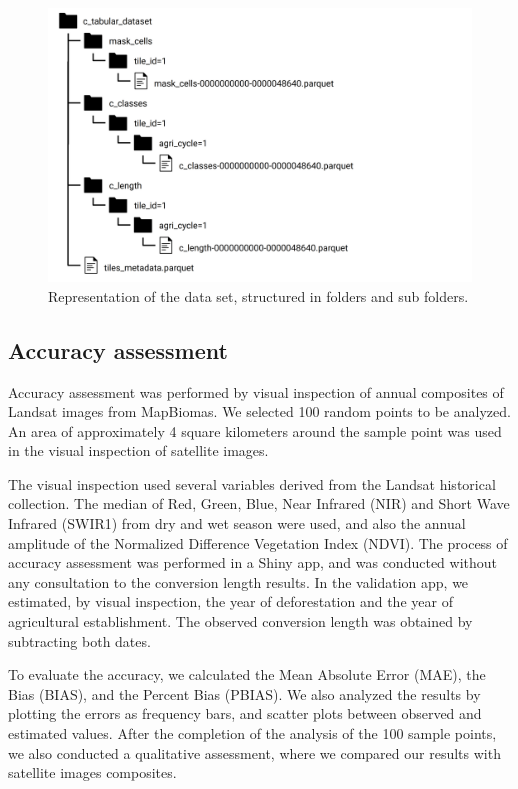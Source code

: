 \documentclass[essd, manuscript]{copernicus}
\begin{document}
\begin{figure}[h]
\includegraphics[width=17cm]{figs/dataset_structure} \caption{ Representation of the data set, structured in folders and sub folders.}\label{fig:dataset-plot}
\end{figure}

\subsection{Accuracy assessment}

Accuracy assessment was performed by visual inspection of annual composites of Landsat images from MapBiomas.
We selected 100 random points to be analyzed.
An area of approximately 4 square kilometers around the sample point was used in the visual inspection of satellite images.

The visual inspection used several variables derived from the Landsat historical collection.
The median of Red, Green, Blue, Near Infrared (NIR) and Short Wave Infrared (SWIR1) from dry and wet season were used, and also the annual amplitude of the Normalized Difference Vegetation Index (NDVI).
The process of accuracy assessment was performed in a Shiny app, and was conducted without any consultation to the conversion length results.
In the validation app, we estimated, by visual inspection, the year of deforestation and the year of agricultural establishment.
The observed conversion length was obtained by subtracting both dates.

To evaluate the accuracy, we calculated the Mean Absolute Error (MAE), the Bias (BIAS), and the Percent Bias (PBIAS).
We also analyzed the results by plotting the errors as frequency bars, and scatter plots between observed and estimated values.
After the completion of the analysis of the 100 sample points, we also conducted a qualitative assessment, where we compared our results with satellite images composites.
\end{document}
